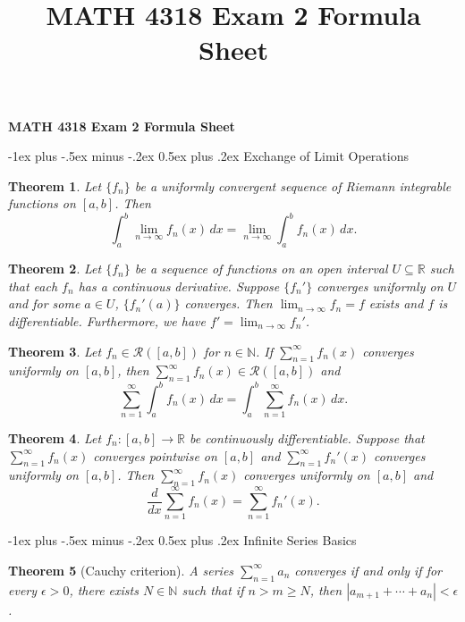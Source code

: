 \documentclass[10pt,landscape]{article}
\title{MATH 4318 Exam 2 Formula Sheet}
\makeatletter
\newtheorem{theorem}{Theorem}
\newcommand{\R}{\mathbb{R}}
\newcommand{\N}{\mathbb{N}}
\renewcommand{\section}{\@startsection{section}{1}{0mm}%
                                {-1ex plus -.5ex minus -.2ex}%
                                {0.5ex plus .2ex}%
                                {\normalfont\large\bfseries}}
\makeatother
\begin{document}
\raggedright
\footnotesize

\begin{center}
     \Large{\textbf{MATH 4318 Exam 2 Formula Sheet}} \\
\end{center}
\begin{multicols}{3}
\setlength{\premulticols}{1pt}
\setlength{\postmulticols}{1pt}
\setlength{\multicolsep}{1pt}
\setlength{\columnsep}{2pt}

\section{Exchange of Limit Operations}
\begin{theorem}
  Let $\{f_n\}$ be a uniformly convergent sequence
  of Riemann integrable functions on $[a, b]$. Then
  \[
    \int_a^b \lim_{n \to \infty} f_n(x)\, dx
    = \lim_{n \to \infty} \int_a^b f_n(x)\, dx.
  \]
\end{theorem}

\begin{theorem}
  Let $\{f_n\}$ be a sequence of functions on an
  open interval $U \subseteq \R$ such that
  each $f_n$ has a continuous derivative. Suppose
  $\{f_n'\}$ converges uniformly on $U$ and for some
  $a \in U$, $\{f_n'(a)\}$ converges. Then
  $\lim_{n \to \infty} f_n = f$ exists and
  $f$ is differentiable. Furthermore, we have
  $f' = \lim_{n \to \infty} f_n'$.
\end{theorem}

\begin{theorem}
  Let $f_n \in \mathcal{R}([a, b])$ for
  $n \in \N$. If $\sum_{n = 1}^\infty f_n(x)$
  converges uniformly on $[a, b]$, then
  $\sum_{n = 1}^\infty f_n(x) \in \mathcal{R}([a, b])$ and
  \[
    \sum_{n = 1}^\infty \int_a^b f_n(x)\, dx
    = \int_a^b \sum_{n = 1}^\infty f_n(x)\, dx.
  \]
\end{theorem}

\begin{theorem}
  Let $f_n : [a, b] \to \R$ be continuously differentiable.
  Suppose that $\sum_{n = 1}^\infty f_n(x)$ converges
  pointwise on $[a, b]$ and $\sum_{n = 1}^\infty f_n'(x)$ converges
  uniformly on $[a, b]$. Then
  $\sum_{n = 1}^\infty f_n(x)$ converges uniformly on $[a, b]$
  and
  \[
    \frac{d}{dx} \sum_{n = 1}^\infty f_n(x)
    = \sum_{n = 1}^\infty f_n'(x).
  \]
\end{theorem}

\section{Infinite Series Basics}
\begin{theorem}[Cauchy criterion]
  A series $\sum_{n = 1}^\infty a_n$ converges if and
  only if for every $\epsilon > 0$, there exists
  $N \in \N$ such that if $n > m \ge N$, then
  $|a_{m + 1} + \cdots + a_n| < \epsilon$.
\end{theorem}


\end{multicols}
\end{document}
